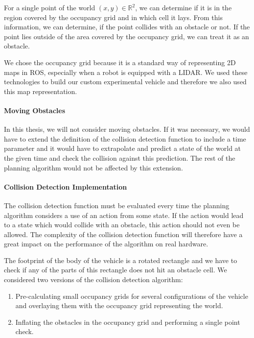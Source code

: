 For a single point of the world $\left(x,y\right)\in \mathbb{R}^2$, we can determine if it is in the region covered by the occupancy grid and in which cell it lays. From this information, we can determine, if the point collides with an obstacle or not. If the point lies outside of the area covered by the occupancy grid, we can treat it as an obstacle.

We chose the occupancy grid because it is a standard way of representing 2D maps in \gls{ROS}, especially when a robot is equipped with a \gls{LIDAR}. We used these technologies to build our custom experimental vehicle and therefore we also used this map representation.

\paragraph{Moving Obstacles}
In this thesis, we will not consider moving obstacles. If it was necessary, we would have to extend the definition of the collision detection function to include a time parameter and it would have to extrapolate and predict a state of the world at the given time and check the collision against this prediction. The rest of the planning algorithm would not be affected by this extension.

\paragraph{Collision Detection Implementation}
The collision detection function must be evaluated every time the planning algorithm considers a use of an action from some state. If the action would lead to a state which would collide with an obstacle, this action should not even be allowed. The complexity of the collision detection function will therefore have a great impact on the performance of the algorithm on real hardware.

The footprint of the body of the vehicle is a rotated rectangle and we have to check if any of the parts of this rectangle does not hit an obstacle cell. We considered two versions of the collision detection algorithm:
\begin{enumerate}
	\item Pre-calculating small occupancy grids for several configurations of the vehicle and overlaying them with the occupancy grid representing the world.
	\item Inflating the obstacles in the occupancy grid and performing a single point check.
\end{enumerate}

